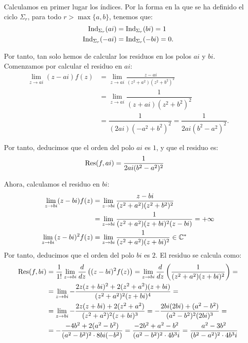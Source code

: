 \begin{ejercicio}
    Calculamos en primer lugar los índices. Por la forma en la que se ha definido el ciclo $\Sigma_r$, para todo $r>\max\{a,b\}$, tenemos que:
    \begin{align*}
        \operatorname{Ind}_{\Sigma_r}(ai) &= \operatorname{Ind}_{\Sigma_r}(bi) = 1\\
        \operatorname{Ind}_{\Sigma_r}(-ai) &= \operatorname{Ind}_{\Sigma_r}(-bi) = 0.
    \end{align*}

    Por tanto, tan solo hemos de calcular los residuos en los polos $ai$ y $bi$. Comenzamos por calcular el residuo en $ai$:
    \begin{align*}
        \lim_{z\to ai} (z - ai)f(z) &= \lim_{z\to ai} \frac{z - ai}{(z^2 + a^2)(z^2 + b^2)^2} \\
        &= \lim_{z\to ai} \dfrac{1}{(z + ai)(z^2 + b^2)^2} \\
        &= \dfrac{1}{(2ai)(-a^2 + b^2)^2} = \dfrac{1}{2ai(b^2 - a^2)^2}.
    \end{align*}

    Por tanto, deducimos que el orden del polo $ai$ es $1$, y que el residuo es:
    \begin{align*}
        \operatorname{Res}(f, ai) &= \dfrac{1}{2ai(b^2 - a^2)^2}
    \end{align*}

    Ahora, calculamos el residuo en $bi$:
    \begin{align*}
        \lim_{z\to bi} (z - bi)f(z) &= \lim_{z\to bi} \frac{z - bi}{(z^2 + a^2)(z^2 + b^2)^2} \\
        &= \lim_{z\to bi} \dfrac{1}{(z^2 + a^2)(z+bi)^2(z - bi)} = +\infty \\
        \lim_{z\to bi} (z-bi)^2 f(z) &= \lim_{z\to bi} \frac{1}{(z^2 + a^2)(z+bi)^2}\in \mathbb{C}^*
    \end{align*}
    Por tanto, deducimos que el orden del polo $bi$ es $2$. El residuo se calcula como:
    \begin{align*}
        \operatorname{Res}(f, bi) &= \dfrac{1}{1!} \lim_{z\to bi} \frac{d}{dz}\left((z - bi)^2 f(z)\right)
        = \lim_{z\to bi} \frac{d}{dz}\left(\frac{1}{(z^2 + a^2)(z+bi)^2}\right)
        =\\&= \lim_{z\to bi} -\frac{2z(z+bi)^2+2(z^2+a^2)(z+bi)}{(z^2 + a^2)^2(z+bi)^4}
        =\\&= \lim_{z\to bi} -\frac{2z(z+bi)+2(z^2+a^2)}{(z^2 + a^2)^2(z+bi)^3}
        = -\dfrac{2bi(2bi) + (a^2-b^2)}{(a^2-b^2)^2(2bi)^3}
        =\\&= -\dfrac{-4b^2 + 2(a^2-b^2)}{(a^2-b^2)^2\cdot 8bi(-b^2)}
        = \dfrac{-2b^2 + a^2-b^2}{(a^2-b^2)^2\cdot 4b^3i}
        = \dfrac{a^2-3b^2}{(b^2-a^2)^2\cdot 4b^3i}
    \end{align*}


\end{ejercicio}
